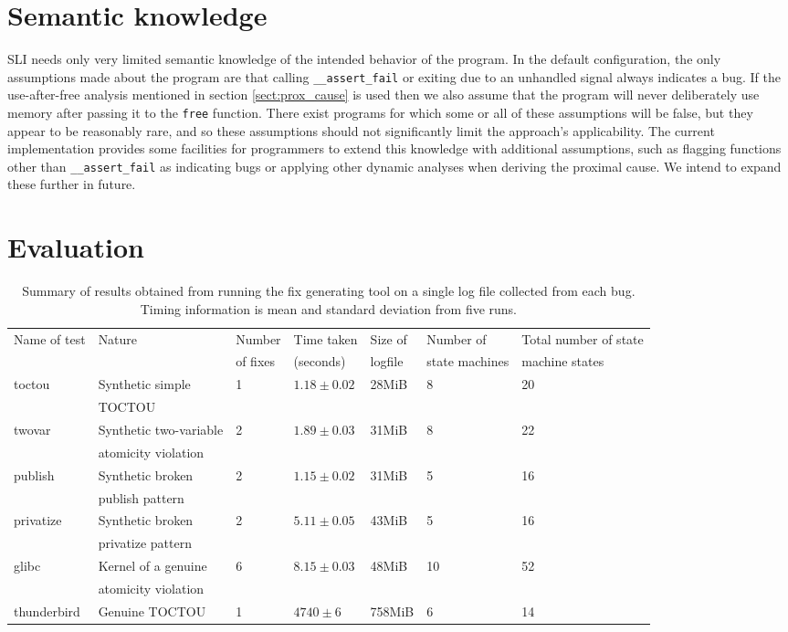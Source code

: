 \documentclass[10pt,twocolumn,preprint,natbib,authoryear]{sigplanconf}
\newcommand{\editorial}[1]{}
\begin{document}
\section{Semantic knowledge}
\label{sect:semanticknowledge}
SLI needs only very limited semantic knowledge of the intended
behavior of the program.  In the default configuration, the only
assumptions made about the program are that calling
\verb|__assert_fail| or exiting due to an unhandled signal always
indicates a bug.  If the use-after-free analysis mentioned in section
\ref{sect:prox_cause} is used then we also assume that the program
will never deliberately use memory after passing it to the \verb|free|
function.  There exist programs for which some or all of these
assumptions will be false, but they appear to be reasonably rare, and
so these assumptions should not significantly limit the approach's
applicability.  The current implementation provides some facilities
for programmers to extend this knowledge with additional assumptions,
such as flagging functions other than \verb|__assert_fail| as
indicating bugs or applying other dynamic analyses when deriving the
proximal cause.  We intend to expand these further in
future.\editorial{Wording doesn't really work very well.}

\section{Evaluation}
\label{sect:evaluation}

\begin{table*}
\begin{tabular}{lllllll}
Name of test & Nature & Number & Time taken & Size of & Number of & Total number of state\\
 & & of fixes & (seconds) & logfile & state machines & machine states\\
\hline
toctou & Synthetic simple & 1 & $1.18 \pm 0.02$ & 28MiB & 8 & 20\\
       & TOCTOU & & & \\
twovar & Synthetic two-variable & 2 & $1.89 \pm 0.03$ & 31MiB & 8 & 22\\
       & atomicity violation &&&\\
publish & Synthetic broken & 2 & $1.15 \pm 0.02$ & 31MiB & 5 & 16 \\
        & publish pattern & & & \\
privatize & Synthetic broken & 2 & $5.11 \pm 0.05$ & 43MiB & 5 & 16 \\
          & privatize pattern & & & \\
\hline
glibc & Kernel of a genuine & 6 & $8.15 \pm 0.03$ & 48MiB & 10 & 52\\
      & atomicity violation & & & \\
\hline
thunderbird & Genuine TOCTOU & 1 & $4740 \pm 6$ & 758MiB & 6 & 14
\end{tabular}
\caption{Summary of results obtained from running the fix generating
  tool on a single log file collected from each bug.  Timing
  information is mean and standard deviation from five runs.}
\label{tab:perf_summary}
\end{table*}
\end{document}
